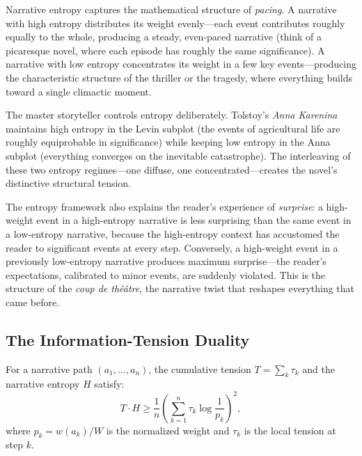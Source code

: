 \begin{interpretation}
\label{interp:entropy}
Narrative entropy captures the mathematical structure of \emph{pacing}.
A narrative with high entropy distributes its weight evenly---each event
contributes roughly equally to the whole, producing a steady, even-paced
narrative (think of a picaresque novel, where each episode has roughly the
same significance).  A narrative with low entropy concentrates its weight
in a few key events---producing the characteristic structure of the
thriller or the tragedy, where everything builds toward a single climactic
moment.

The master storyteller controls entropy deliberately.  Tolstoy's
\textit{Anna Karenina} maintains high entropy in the Levin subplot (the
events of agricultural life are roughly equiprobable in significance) while
keeping low entropy in the Anna subplot (everything converges on the
inevitable catastrophe).  The interleaving of these two entropy regimes---one
diffuse, one concentrated---creates the novel's distinctive structural
tension.

The entropy framework also explains the reader's experience of
\emph{surprise}: a high-weight event in a high-entropy narrative is less
surprising than the same event in a low-entropy narrative, because the
high-entropy context has accustomed the reader to significant events at
every step.  Conversely, a high-weight event in a previously low-entropy
narrative produces maximum surprise---the reader's expectations, calibrated
to minor events, are suddenly violated.  This is the structure of the
\emph{coup de th\'e\^atre}, the narrative twist that reshapes everything
that came before.
\end{interpretation}

\subsection{The Information-Tension Duality}

\begin{theorem}
\label{thm:info-tension}
For a narrative path $(a_1, \ldots, a_n)$, the cumulative tension
$T = \sum_k \tau_k$ and the narrative entropy $H$ satisfy:
\[
  T \cdot H \geq \frac{1}{n}\left(\sum_{k=1}^{n} \tau_k \log \frac{1}{p_k}\right)^2,
\]
where $p_k = w(a_k)/W$ is the normalized weight and $\tau_k$ is the
local tension at step $k$.
\end{theorem}

